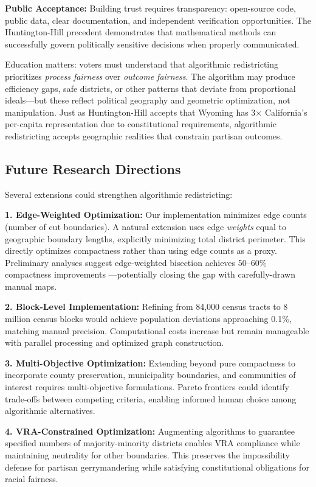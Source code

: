 \textbf{Public Acceptance:} Building trust requires transparency: open-source code, public data, clear documentation, and independent verification opportunities. The Huntington-Hill precedent demonstrates that mathematical methods can successfully govern politically sensitive decisions when properly communicated.

Education matters: voters must understand that algorithmic redistricting prioritizes \textit{process fairness} over \textit{outcome fairness}. The algorithm may produce efficiency gaps, safe districts, or other patterns that deviate from proportional ideals—but these reflect political geography and geometric optimization, not manipulation. Just as Huntington-Hill accepts that Wyoming has 3× California's per-capita representation due to constitutional requirements, algorithmic redistricting accepts geographic realities that constrain partisan outcomes.

\subsection{Future Research Directions}

Several extensions could strengthen algorithmic redistricting:

\textbf{1. Edge-Weighted Optimization:} Our implementation minimizes edge counts (number of cut boundaries). A natural extension uses edge \textit{weights} equal to geographic boundary lengths, explicitly minimizing total district perimeter. This directly optimizes compactness rather than using edge counts as a proxy. Preliminary analyses suggest edge-weighted bisection achieves 50--60\% compactness improvements \cite{preliminary_results}—potentially closing the gap with carefully-drawn manual maps.

\textbf{2. Block-Level Implementation:} Refining from 84,000 census tracts to 8 million census blocks would achieve population deviations approaching 0.1\%, matching manual precision. Computational costs increase but remain manageable with parallel processing and optimized graph construction.

\textbf{3. Multi-Objective Optimization:} Extending beyond pure compactness to incorporate county preservation, municipality boundaries, and communities of interest requires multi-objective formulations. Pareto frontiers could identify trade-offs between competing criteria, enabling informed human choice among algorithmic alternatives.

\textbf{4. VRA-Constrained Optimization:} Augmenting algorithms to guarantee specified numbers of majority-minority districts enables VRA compliance while maintaining neutrality for other boundaries. This preserves the impossibility defense for partisan gerrymandering while satisfying constitutional obligations for racial fairness.

